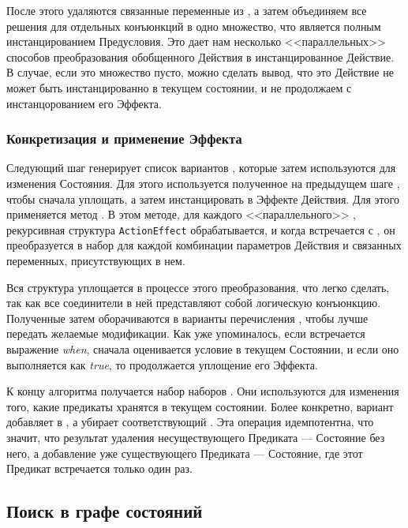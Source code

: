 После этого удаляются связанные переменные из ,
а затем объединяем все решения для отдельных конъюнкций в одно множество,
что является полным инстанцированием Предусловия.
Это дает нам несколько <<параллельных>> способов преобразования
обобщенного Действия в инстанцированное Действие.
В случае, если это множество пусто, можно сделать вывод,
что это Действие не может быть инстанцированно в текущем состоянии,
и не продолжаем с инстанцорованием его Эффекта.

\subsubsection{Конкретизация и применение Эффекта}

Следующий шаг генерирует список вариантов ,
которые затем используются для изменения Состояния.
Для этого используется полученное на предыдущем шаге ,
чтобы сначала уплощать, а затем инстанцировать  в Эффекте Действия.
Для этого применяется метод .
В этом методе, для каждого <<параллельного>> ,
рекурсивная структура \texttt{ActionEffect} обрабатывается,
и когда встречается  с ,
он преобразуется в набор 
для каждой комбинации параметров Действия и связанных переменных,
присутствующих в нем.

Вся структура уплощается в процессе этого преобразования,
что легко сделать, так как все соединители в ней представляют собой
логическую конъюнкцию.
Полученные  затем оборачиваются в варианты
перечисления ,
чтобы лучше передать желаемые модификации.
Как уже упоминалось, если встречается выражение \textit{when},
сначала оценивается условие в текущем Состоянии,
и если оно выполняется как \textit{true}, то продолжается уплощение его Эффекта.

К концу алгоритма получается набор наборов .
Они используются для изменения того, какие предикаты хранятся в текущем состоянии.
Более конкретно,  вариант добавляет 
в , а  убирает соответствующий .
Эта операция идемпотентна, что значит,
что результат удаления несуществующего Предиката --- Состояние без него,
а добавление уже существующего Предиката --- Состояние,
где этот Предикат встречается только один раз.

\subsection{Поиск в графе состояний}

